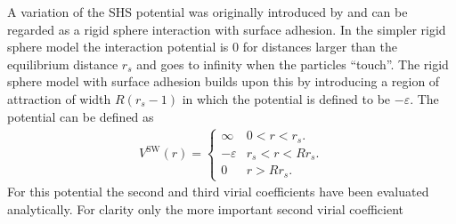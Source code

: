 %
A variation of the \acf{SHS} potential was originally introduced by
\citeauthor{baxter68}\autocite{baxter68} and can be regarded as a rigid sphere
interaction with surface adhesion. In the simpler rigid sphere model the
interaction potential is 0 for distances larger than the equilibrium distance
$r_s$ and goes to infinity when the particles ``touch''. The rigid sphere model
with surface adhesion builds upon this by introducing a region of
attraction of width $R(r_s-1)$ in which the potential is defined to be $-\varepsilon$.
The potential can be defined as
%
\begin{align}
    V^\text{SW}(r) =
    \begin{cases}
        \infty & 0 < r < r_s.\\
        -\varepsilon & r_s < r < Rr_s.\\
        0 & r > Rr_s.
    \end{cases}
\end{align}
%
For this potential the second and third virial coefficients have been evaluated
analytically. For clarity only the more important second virial coefficient
